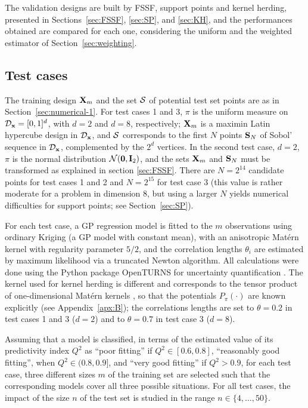 The validation designs are built by FSSF, support points and kernel herding, presented in Sections~\ref{sec:FSSF}, \ref{sec:SP}, and \ref{sec:KH}, 
and the performances obtained are compared for each one, considering the uniform and the weighted estimator of Section~\ref{sec:weighting}. 

\subsection{Test cases} \label{sec:testCases}

The training design ${\bf X}_m$ and the set $\mathcal{S}$ of potential test set points are as in Section~\ref{sec:numerical-1}. 
For test cases 1 and 3, $\pi$ is the uniform measure on $\mathcal{D}_{\bf x}=[0,1]^d$, with $d=2$ and $d=8$, respectively; ${\bf X}_m$ is a maximin Latin hypercube design in $\mathcal{D}_{\bf x}$, and $\mathcal{S}$ corresponds to the first $N$ points $\mathbf{S}_N$ of Sobol' sequence in $\mathcal{D}_{\bf x}$, complemented by the $2^d$ vertices. 
In the second test case, $d=2$, $\pi$ is the normal distribution $\SN(\0b,\Ib_2)$, and the sets ${\bf X}_m$ and $\mathbf{S}_N$ must be transformed as explained in section \ref{sec:FSSF}. 
There are $N=2^{14}$ candidate points for test cases 1 and 2 and $N=2^{15}$ for test case 3 (this value is rather moderate for a problem in dimension 8, but using a larger $N$ yields numerical difficulties for support points; see Section~\ref{sec:SP}). 

For each test case, a GP regression model is fitted to the $m$ observations using ordinary Kriging \citep{rasmussen_2006} (a GP model with constant mean), with an anisotropic Matérn kernel with regularity parameter $5/2$, and the correlation lengths $\theta_i$ are estimated by maximum likelihood via a truncated Newton algorithm. 
All calculations were done using the Python package OpenTURNS for uncertainty quantification \citep{baudin_dutfoy_2017}. 
The kernel used for kernel herding is different and corresponds to the tensor product of one-dimensional Matérn kernels , so that the potentials $P_{\pi}(\cdot)$ are known explicitly (see Appendix~\ref{apx:B}); the correlations lengths are set to $\theta=0.2$ in test cases 1 and 3 ($d=2$) and to $\theta=0.7$ in test case 3 ($d=8$).

Assuming that a model is classified, in terms of the estimated value of its predictivity index $Q^2$ as ``poor fitting'' if $Q^2\in[0.6, 0.8]$, ``reasonably good fitting'', when $Q^2\in(0.8,0.9]$, and ``very good fitting'' if $Q^2>0.9$, for each test case, three different sizes $m$ of the training set are selected such that the corresponding models cover all three possible situations. 
For all test cases, the impact of the size $n$ of the test set is studied in the range $n\in\{4,\ldots,50\}$.

